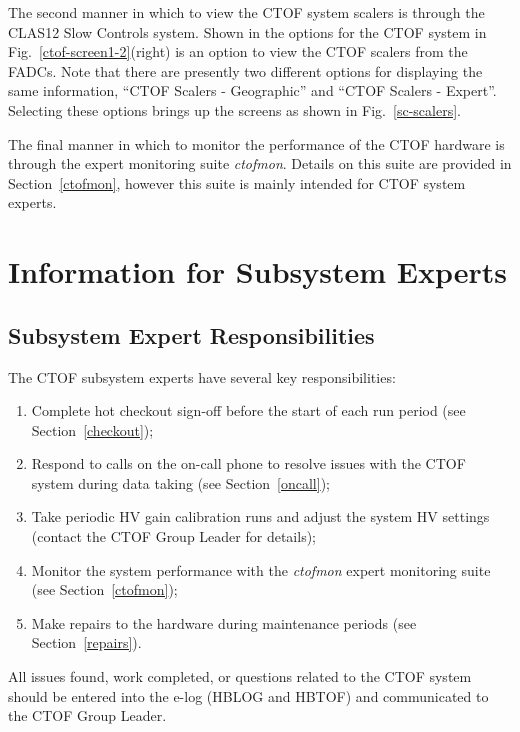 \documentclass[12pt]{article}
\begin{document}
The second manner in which to view the CTOF system scalers is through the CLAS12 Slow Controls system.
Shown in the options for the CTOF system in Fig.~\ref{ctof-screen1-2}(right) is an option to view the CTOF
scalers from the FADCs. Note that there are presently two different options for displaying the same
information, ``CTOF Scalers - Geographic'' and ``CTOF Scalers - Expert''. Selecting these options brings
up the screens as shown in Fig.~\ref{sc-scalers}.

The final manner in which to monitor the performance of the CTOF hardware is through the expert monitoring
suite {\it ctofmon}. Details on this suite are provided in Section~\ref{ctofmon}, however this suite is mainly
intended for CTOF system experts.

\clearpage

\vfil
\eject

\section{Information for Subsystem Experts}

\subsection{Subsystem Expert Responsibilities}

The CTOF subsystem experts have several key responsibilities:

\begin{enumerate}
\item Complete hot checkout sign-off before the start of each run period (see Section~\ref{checkout});
\item Respond to calls on the on-call phone to resolve issues with the CTOF system during data taking (see
Section~\ref{oncall});
\item Take periodic HV gain calibration runs and adjust the system HV settings (contact the CTOF Group
Leader for details);
\item Monitor the system performance with the {\it ctofmon} expert monitoring suite (see
Section~\ref{ctofmon});
\item Make repairs to the hardware during maintenance periods (see Section~\ref{repairs}).
\end{enumerate}

All issues found, work completed, or questions related to the CTOF system should be entered into the
e-log (HBLOG and HBTOF) and communicated to the CTOF Group Leader.
\end{document}
